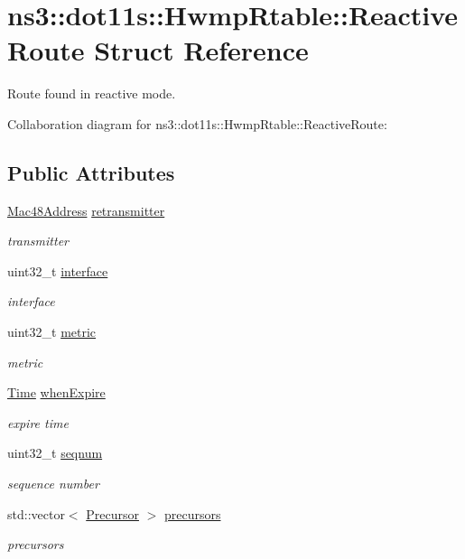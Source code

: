 \hypertarget{structns3_1_1dot11s_1_1HwmpRtable_1_1ReactiveRoute}{}\section{ns3\+:\+:dot11s\+:\+:Hwmp\+Rtable\+:\+:Reactive\+Route Struct Reference}
\label{structns3_1_1dot11s_1_1HwmpRtable_1_1ReactiveRoute}


Route found in reactive mode.  




Collaboration diagram for ns3\+:\+:dot11s\+:\+:Hwmp\+Rtable\+:\+:Reactive\+Route\+:
\subsection*{Public Attributes}
\begin{DoxyCompactItemize}
\item 
\hyperlink{classns3_1_1Mac48Address}{Mac48\+Address} \hyperlink{structns3_1_1dot11s_1_1HwmpRtable_1_1ReactiveRoute_a4d147cace87b0f78028b77acc2e38162}{retransmitter}
\begin{DoxyCompactList}\small\item\em transmitter \end{DoxyCompactList}\item 
uint32\+\_\+t \hyperlink{structns3_1_1dot11s_1_1HwmpRtable_1_1ReactiveRoute_a78ab06c32e9beb2f5cf3b1aa8aa064bf}{interface}
\begin{DoxyCompactList}\small\item\em interface \end{DoxyCompactList}\item 
uint32\+\_\+t \hyperlink{structns3_1_1dot11s_1_1HwmpRtable_1_1ReactiveRoute_ac9be60e8458e1b7b312ea5b91d2a6dcd}{metric}
\begin{DoxyCompactList}\small\item\em metric \end{DoxyCompactList}\item 
\hyperlink{classns3_1_1Time}{Time} \hyperlink{structns3_1_1dot11s_1_1HwmpRtable_1_1ReactiveRoute_a48ebe06c74fcf3944b1b0bc714ea2c2a}{when\+Expire}
\begin{DoxyCompactList}\small\item\em expire time \end{DoxyCompactList}\item 
uint32\+\_\+t \hyperlink{structns3_1_1dot11s_1_1HwmpRtable_1_1ReactiveRoute_ad1f0b941bbef9a89054c2e8c88c210fd}{seqnum}
\begin{DoxyCompactList}\small\item\em sequence number \end{DoxyCompactList}\item 
std\+::vector$<$ \hyperlink{structns3_1_1dot11s_1_1HwmpRtable_1_1Precursor}{Precursor} $>$ \hyperlink{structns3_1_1dot11s_1_1HwmpRtable_1_1ReactiveRoute_a6911d97217fc527c4b93d3478cc2142b}{precursors}
\begin{DoxyCompactList}\small\item\em precursors \end{DoxyCompactList}\end{DoxyCompactItemize}



